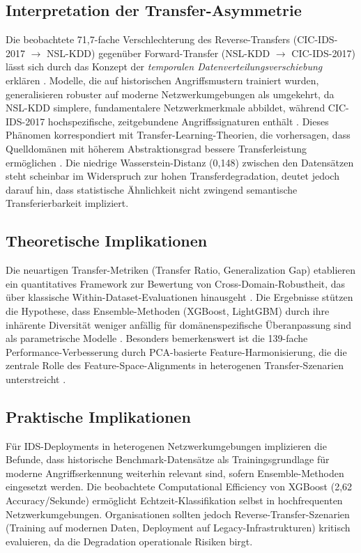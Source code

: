 \documentclass[11pt,a4paper]{article}
\begin{document}
    \subsection{Interpretation der Transfer-Asymmetrie}

    Die beobachtete 71,7-fache Verschlechterung des Reverse-Transfers (CIC-IDS-2017 $\rightarrow$ NSL-KDD) gegenüber Forward-Transfer (NSL-KDD $\rightarrow$ CIC-IDS-2017) lässt sich durch das Konzept der \textit{temporalen Datenverteilungsverschiebung} erklären \parencite{Ring2019}. Modelle, die auf historischen Angriffsmustern trainiert wurden, generalisieren robuster auf moderne Netzwerkumgebungen als umgekehrt, da NSL-KDD simplere, fundamentalere Netzwerkmerkmale abbildet, während CIC-IDS-2017 hochspezifische, zeitgebundene Angriffssignaturen enthält \parencite{Sharafaldin2018}. Dieses Phänomen korrespondiert mit Transfer-Learning-Theorien, die vorhersagen, dass Quelldomänen mit höherem Abstraktionsgrad bessere Transferleistung ermöglichen \parencite{Goodfellow2016}. Die niedrige Wasserstein-Distanz (0,148) zwischen den Datensätzen steht scheinbar im Widerspruch zur hohen Transferdegradation, deutet jedoch darauf hin, dass statistische Ähnlichkeit nicht zwingend semantische Transferierbarkeit impliziert.

    \subsection{Theoretische Implikationen}

    Die neuartigen Transfer-Metriken (Transfer Ratio, Generalization Gap) etablieren ein quantitatives Framework zur Bewertung von Cross-Domain-Robustheit, das über klassische Within-Dataset-Evaluationen hinausgeht \parencite{Mourouzis2021}. Die Ergebnisse stützen die Hypothese, dass Ensemble-Methoden (XGBoost, LightGBM) durch ihre inhärente Diversität weniger anfällig für domänenspezifische Überanpassung sind als parametrische Modelle \parencite{Hastie2009}. Besonders bemerkenswert ist die 139-fache Performance-Verbesserung durch PCA-basierte Feature-Harmonisierung, die die zentrale Rolle des Feature-Space-Alignments in heterogenen Transfer-Szenarien unterstreicht \parencite{Goodfellow2016}.

    \subsection{Praktische Implikationen}

    Für IDS-Deployments in heterogenen Netzwerkumgebungen implizieren die Befunde, dass historische Benchmark-Datensätze als Trainingsgrundlage für moderne Angriffserkennung weiterhin relevant sind, sofern Ensemble-Methoden eingesetzt werden. Die beobachtete Computational Efficiency von XGBoost (2,62 Accuracy/Sekunde) ermöglicht Echtzeit-Klassifikation selbst in hochfrequenten Netzwerkumgebungen. Organisationen sollten jedoch Reverse-Transfer-Szenarien (Training auf modernen Daten, Deployment auf Legacy-Infrastrukturen) kritisch evaluieren, da die Degradation operationale Risiken birgt.
\end{document}
